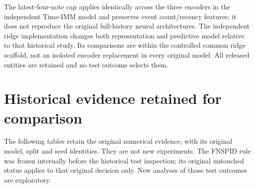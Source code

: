 The latest-four-note cap applies identically across the three encoders in the independent Time-IMM model and preserves event count/recency features; it does not reproduce the original full-history neural architectures. The independent ridge implementation changes both representation and predictive model relative to that historical study. Its comparisons are within the controlled common ridge scaffold, not an isolated encoder replacement in every original model. All released entities are retained and no test outcome selects them.















\section{Historical evidence retained for comparison}

The following tables retain the original numerical evidence, with its original model, split and seed identities. They are not new experiments. The FNSPID rule was frozen internally before the historical test inspection; its original untouched status applies to that original decision only. New analyses of those test outcomes are exploratory.



